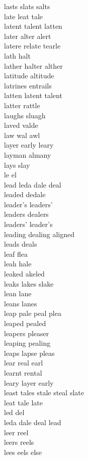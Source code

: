 lasts slats salts\\
late leat tale\\
latent talent latten\\
later alter alert\\
latere relate tearle\\
lath halt\\
lather halter alther\\
latitude altitude\\
latrines entrails\\
latten latent talent\\
latter rattle\\
laughs sluagh\\
laved valde\\
law wal awl\\
layer early leary\\
layman almany\\
lays slay\\
le el\\
lead leda dale deal\\
leaded dedale\\
leader's leaders'\\
leaders dealers\\
leaders' leader's\\
leading dealing aligned\\
leads deals\\
leaf flea\\
leah hale\\
leaked akeled\\
leaks lakes slake\\
lean lane\\
leans lanes\\
leap pale peal plea\\
leaped pealed\\
leapers pleaser\\
leaping pealing\\
leaps lapse pleas\\
lear real earl\\
learnt rental\\
leary layer early\\
least tales stale steal slate\\
leat tale late\\
led del\\
leda dale deal lead\\
leer reel\\
leers reels\\
lees eels else\\
